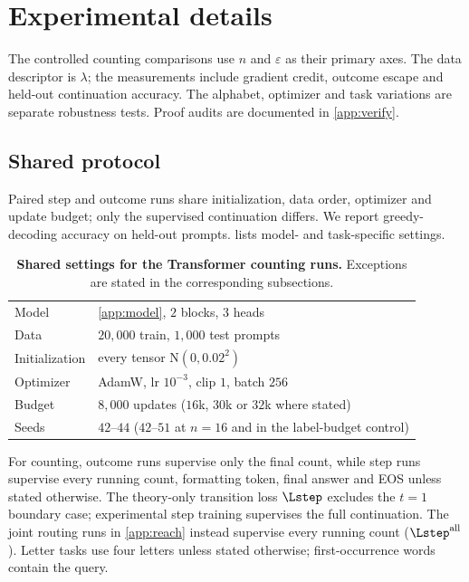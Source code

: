 



\section{Experimental details}
\label{app:experiments}
\label{app:experimental-details}



The controlled counting comparisons use $n$ and $\varepsilon$ as their primary
axes. The data descriptor is $\lambda$; the measurements include gradient credit,
outcome escape and held-out continuation accuracy.
The alphabet, optimizer and task variations are separate robustness tests.
Proof audits are documented in \cref{app:verify}.

\subsection{Shared protocol}
\label{app:letter-protocol}
Paired step and outcome runs share initialization, data order, optimizer and update budget; only the supervised continuation differs.
We report greedy-decoding accuracy on held-out prompts.  lists model- and task-specific settings.

\begin{table}[H]
\centering\small
\begin{tabular}{@{}ll@{}}
\toprule
Model & \cref{app:model}, $2$ blocks, $3$ heads\\
Data & $20{,}000$ train, $1{,}000$ test prompts\\
Initialization & every tensor $\mathrm N(0,0.02^2)$\\
Optimizer & AdamW, lr $10^{-3}$, clip $1$, batch $256$\\
Budget & $8{,}000$ updates ($16$k, $30$k or $32$k where stated)\\
Seeds & $42$--$44$ ($42$--$51$ at $n=16$ and in the label-budget control)\\
\bottomrule
\end{tabular}
\caption{\textbf{Shared settings for the Transformer counting runs.} Exceptions are stated in the corresponding subsections.}
\label{tab:protocol}
\end{table}

For counting, outcome runs supervise only the final count, while step runs supervise every running count, formatting token,
final answer and EOS unless stated otherwise. The theory-only transition loss $\Lstep$ excludes the $t=1$ boundary case;
experimental step training supervises the full continuation. The joint routing runs in \cref{app:reach} instead supervise
every running count ($\Lstep^{\mathrm{all}}$). Letter tasks use four letters unless stated otherwise; first-occurrence words contain the query.

